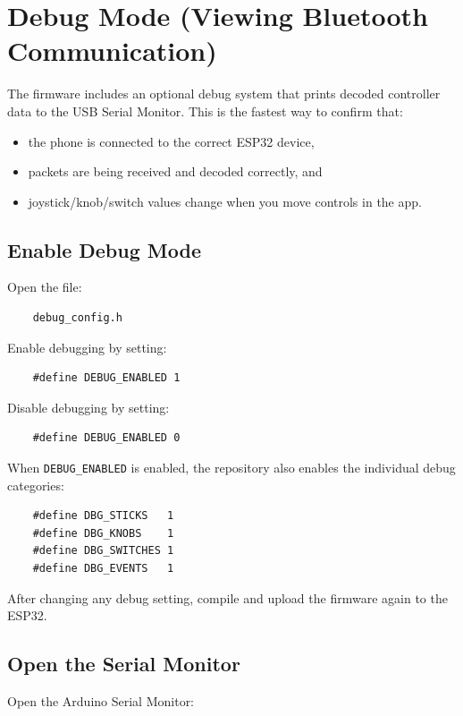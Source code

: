 \section{Debug Mode (Viewing Bluetooth Communication)}
The firmware includes an optional debug system that prints decoded controller data to the USB Serial Monitor.
This is the fastest way to confirm that:
\begin{itemize}
    \item the phone is connected to the correct ESP32 device,
    \item packets are being received and decoded correctly, and
    \item joystick/knob/switch values change when you move controls in the app.
\end{itemize}

\subsection{Enable Debug Mode}
Open the file:

\begin{verbatim}
    debug_config.h
\end{verbatim}

Enable debugging by setting:

\begin{verbatim}
    #define DEBUG_ENABLED 1
\end{verbatim}

Disable debugging by setting:

\begin{verbatim}
    #define DEBUG_ENABLED 0
\end{verbatim}

When \verb|DEBUG_ENABLED| is enabled, the repository also enables the individual debug categories:

\begin{verbatim}
    #define DBG_STICKS   1
    #define DBG_KNOBS    1
    #define DBG_SWITCHES 1
    #define DBG_EVENTS   1
\end{verbatim}

After changing any debug setting, compile and upload the firmware again to the ESP32.

\subsection{Open the Serial Monitor}

Open the Arduino Serial Monitor:

